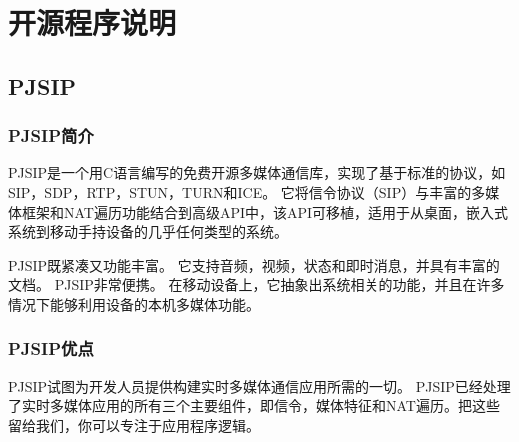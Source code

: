 \documentclass[a4paper,AutoFakeBold,oneside,12pt]{book}
\begin{document}

\chapter{开源程序说明}
\section{PJSIP}
\subsection{PJSIP简介}
PJSIP是一个用C语言编写的免费开源多媒体通信库，实现了基于标准的协议，如SIP，SDP，RTP，STUN，TURN和ICE。 它将信令协议（SIP）与丰富的多媒体框架和NAT遍历功能结合到高级API中，该API可移植，适用于从桌面，嵌入式系统到移动手持设备的几乎任何类型的系统。\cite{webster_pjsip}

PJSIP既紧凑又功能丰富。 它支持音频，视频，状态和即时消息，并具有丰富的文档。 PJSIP非常便携。 在移动设备上，它抽象出系统相关的功能，并且在许多情况下能够利用设备的本机多媒体功能。

\subsection{PJSIP优点}

PJSIP试图为开发人员提供构建实时多媒体通信应用所需的一切。 PJSIP已经处理了实时多媒体应用的所有三个主要组件，即信令，媒体特征和NAT遍历。把这些留给我们，你可以专注于应用程序逻辑。
\end{document}

